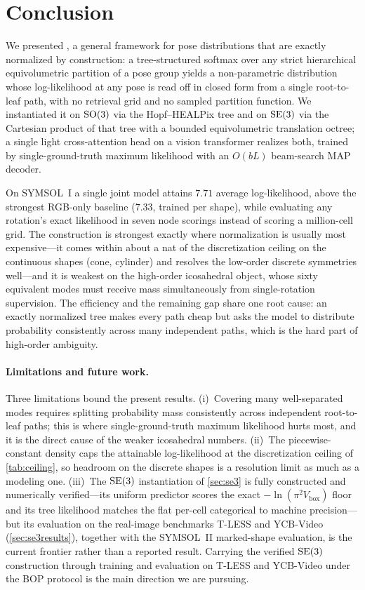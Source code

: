 \section{Conclusion}
\label{sec:conclusion}

We presented \method{}, a general framework for pose distributions that are
exactly normalized by construction: a tree-structured softmax over any strict
hierarchical equivolumetric partition of a pose group yields a non-parametric
distribution whose log-likelihood at any pose is read off in closed form from a
single root-to-leaf path, with no retrieval grid and no sampled partition
function. We instantiated it on $\mathrm{SO}(3)$ via the Hopf--HEALPix tree and on
$\mathrm{SE}(3)$ via the Cartesian product of that tree with a bounded equivolumetric
translation octree; a single light cross-attention head on a vision transformer
realizes both, trained by single-ground-truth maximum likelihood with an $O(bL)$
beam-search MAP decoder.

On SYMSOL~I a single joint model attains $7.71$ average log-likelihood, above the
strongest RGB-only baseline ($7.33$, trained per shape), while evaluating any
rotation's exact likelihood in seven node scorings instead of scoring a
million-cell grid. The construction is strongest exactly where normalization is
usually most expensive---it comes within about a nat of the discretization ceiling on
the continuous shapes (cone, cylinder) and resolves the low-order discrete
symmetries well---and it is weakest on the high-order icosahedral object, whose
sixty equivalent modes must receive mass simultaneously from single-rotation
supervision. The efficiency and the remaining gap share one root cause: an
exactly normalized tree makes every path cheap but asks the model to distribute
probability consistently across many independent paths, which is the hard part of
high-order ambiguity.

\paragraph{Limitations and future work.}
Three limitations bound the present results. (i)~Covering many well-separated modes
requires splitting probability mass consistently across independent root-to-leaf
paths; this is where single-ground-truth maximum likelihood hurts most, and it is the
direct cause of the weaker icosahedral numbers. (ii)~The piecewise-constant density
caps the attainable log-likelihood at the discretization ceiling of
\cref{tab:ceiling}, so headroom on the discrete shapes is a resolution limit as
much as a modeling one. (iii)~The $\mathrm{SE}(3)$ instantiation of \cref{sec:se3} is
fully constructed and numerically verified---its uniform predictor scores the
exact $-\ln(\pi^2 V_{\mathrm{box}})$ floor and its tree likelihood matches the
flat per-cell categorical to machine precision---but its evaluation on the
real-image benchmarks T-LESS and YCB-Video (\cref{sec:se3results}), together with
the SYMSOL~II marked-shape evaluation, is the current frontier rather than a
reported result. Carrying the verified $\mathrm{SE}(3)$ construction through training
and evaluation on T-LESS and YCB-Video under the BOP protocol is the main
direction we are pursuing.

